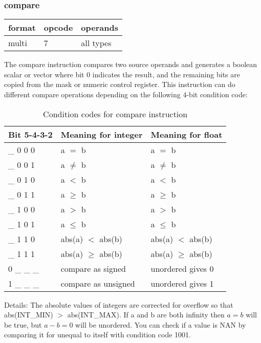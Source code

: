 \documentclass[forwardcom.tex]{subfiles}
\begin{document}
\subsubsection{compare} \label{compare}
\label{table:compareInstruction}
\begin{tabular}{|p{12mm}|p{12mm}|p{110mm}|}
\hline
\bfseries format & \bfseries opcode & \bfseries operands \\ \hline
multi &  7 & all types \\ \hline
\end{tabular}
\vspace{2mm}

The compare instruction compares two source operands and generates a boolean scalar or vector where bit 0 indicates the result, and the remaining bits are copied from the mask or numeric control register. This instruction can do different compare operations depending on the following 4-bit condition code:

\begin{longtable} {|p{14mm}|p{55mm}|p{55mm}|}
\caption{Condition codes for compare instruction} 
\label{table:conditionCodesForCompareInstruction} \\
\endfirsthead
\endhead
\hline
\bfseries Bit 5-4-3-2 & \bfseries Meaning for integer & \bfseries Meaning for float \\
\hline
\_ 0 0 0 & a $=$ b & a $=$ b \\
\_ 0 0 1 & a $\neq$ b & a $\neq$ b \\
\_ 0 1 0 & a $<$ b & a $<$ b \\
\_ 0 1 1 & a $\geq$ b & a $\geq$ b \\
\_ 1 0 0 & a $>$ b & a $>$ b \\
\_ 1 0 1 & a $\leq$ b & a $\leq$ b \\
\_ 1 1 0 & abs(a) $<$ abs(b) & abs(a) $<$ abs(b) \\
\_ 1 1 1 & abs(a) $\geq$ abs(b) & abs(a) $\geq$ abs(b) \\
\hline
0 \_ \_ \_ & compare as signed & unordered gives 0 \\
1 \_ \_ \_ & compare as unsigned & unordered gives 1 \\
\hline
\end{longtable}
Details: The absolute values of integers are corrected for overflow so that abs(INT\_MIN) $>$ abs(INT\_MAX).
If a and b are both infinity then $a = b$ will be true, but $a-b = 0$ will be unordered.
You can check if a value is NAN by comparing it for unequal to itself with condition code 1001.
\end{document}
